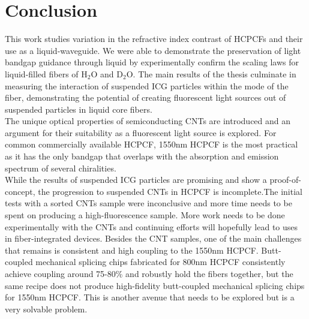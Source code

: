 \chapter{Conclusion}
This work studies variation in the refractive index contrast of HCPCFs and their use as a liquid-waveguide. We were able to demonstrate the preservation of light bandgap guidance through liquid by experimentally confirm the scaling laws for liquid-filled fibers of H${}_2$O and D${}_2$O.  The main results of the thesis culminate in measuring the interaction of suspended ICG particles within the mode of the fiber, demonstrating the potential of creating fluorescent light sources out of suspended particles in liquid core fibers.\\
 
The unique optical properties of semiconducting CNTs are introduced and an argument for their suitability as a fluorescent light source is explored. For common commercially available HCPCF, 1550nm HCPCF is the most practical as it has the only bandgap that overlaps with the absorption and emission spectrum of several chiralities.\\

While the results of suspended ICG particles are promising and show a proof-of-concept, the progression to suspended CNTs in HCPCF is incomplete.The initial tests with a sorted CNTs sample were inconclusive and more time needs to be spent on producing a high-fluorescence  sample. More work needs to be done experimentally with the CNTs and continuing efforts will hopefully lead to uses in fiber-integrated devices. Besides the CNT samples, one of the main challenges that remains is consistent and high coupling to the 1550nm HCPCF. Butt-coupled mechanical splicing chips fabricated for 800nm HCPCF consistently achieve coupling around 75-80\% and robustly hold the fibers together\cite{maruf}, but the same recipe does not produce high-fidelity butt-coupled mechanical splicing chips for 1550nm HCPCF. This is another avenue that needs to be explored but is a very solvable problem.

